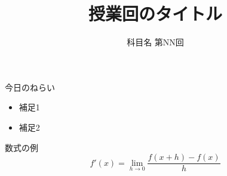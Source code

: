 \documentclass[aspectratio=169]{beamer}
\title{授業回のタイトル}
\subtitle{科目名 第NN回}
\author{}
\date{}
\begin{document}
\begin{frame}
  \titlepage
\end{frame}

\begin{frame}{今日のねらい}
  \begin{itemize}
    \item 補足1
    \item 補足2
  \end{itemize}
\end{frame}

\begin{frame}{数式の例}
  \[
    f'(x) = \lim_{h \to 0} \frac{f(x+h) - f(x)}{h}
  \]
\end{frame}
\end{document}
